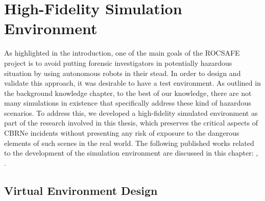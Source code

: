 \chapter{High-Fidelity Simulation Environment}\label{chap:HighFidelitySim}



As highlighted in the introduction, one of the main goals of the ROCSAFE project \cite{Bagherzadeh2017ROCSAFE:Incidents} is to avoid putting forensic investigators in potentially hazardous situation by using autonomous robots in their stead. In order to design and validate this approach, it was desirable to have a test environment. As outlined in the background knowledge chapter, to the best of our knowledge, there are not many simulations in existence that specifically address these kind of hazardous scenarios. To address this, we developed a high-fidelity simulated environment as part of the research involved in this thesis, which preserves the critical aspects of CBRNe incidents without presenting any risk of exposure to the dangerous elements of such scenes in the real world. The following published works related to the development of the simulation environment are discussed in this chapter: \cite{Smyth2018AInvestigation}, \cite{Smyth2018UsingDrones}.


\section{Virtual Environment Design}


